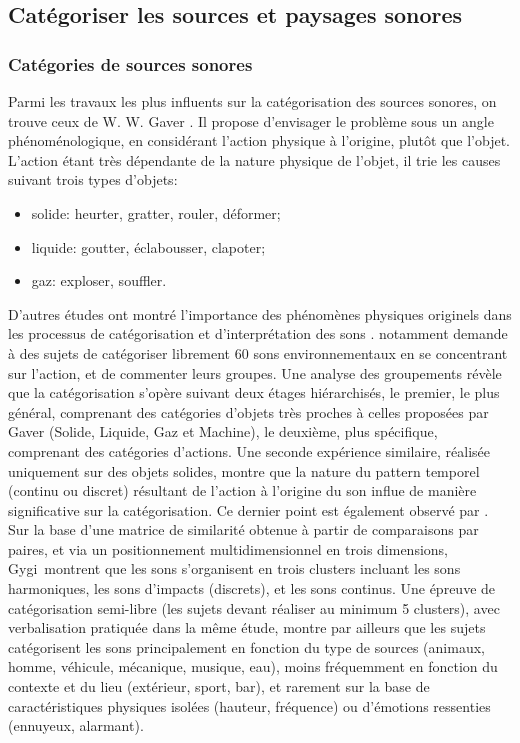 \subsection{Catégoriser les sources et paysages sonores}
\label{sec:ch3_catSourceSoundScape}

\subsubsection{Catégories de sources sonores}
\label{sec:ch3_catSource}

Parmi les travaux les plus influents sur la catégorisation des sources sonores, on trouve ceux de W. W. Gaver \citep{gaver1993world,gaver1993we}. Il propose d'envisager le problème sous un angle phénoménologique, en considérant l'action physique à l'origine, plutôt que l'objet. L'action étant très dépendante de la nature physique de l'objet, il trie les causes suivant trois types d'objets:

\begin{itemize}
\item solide: heurter, gratter, rouler, déformer;
\item liquide: goutter, éclabousser, clapoter;
\item gaz: exploser, souffler.
\end{itemize} 

D'autres études ont montré l'importance des phénomènes physiques originels dans les processus de catégorisation et d'interprétation des sons \citep{marcell2000confrontation,lemaitre2010listener}. \citep{houix_lexical_2012} notamment demande à des sujets de catégoriser librement 60 sons environnementaux en se concentrant sur l'action, et de commenter leurs groupes. Une analyse des groupements révèle que la catégorisation s'opère suivant deux étages hiérarchisés, le premier, le plus général, comprenant des catégories d'objets très proches à celles proposées par Gaver (Solide, Liquide, Gaz et Machine), le deuxième, plus spécifique, comprenant des catégories d'actions. Une seconde expérience similaire, réalisée uniquement sur des objets solides, montre que la nature du pattern temporel (continu ou discret) résultant de l'action à l'origine du son influe de manière significative sur la catégorisation. Ce dernier point est également observé par \citep{gygi2007similarity}. Sur la base d'une matrice de similarité obtenue à partir de comparaisons par paires, et via un positionnement multidimensionnel en trois dimensions, Gygi~\al montrent que les sons s'organisent en trois clusters incluant les sons harmoniques, les sons d'impacts (discrets), et les sons continus. Une épreuve de catégorisation semi-libre (les sujets devant réaliser au minimum 5 clusters), avec verbalisation pratiquée dans la même étude, montre par ailleurs que les sujets catégorisent les sons principalement en fonction du type de sources (animaux, homme, véhicule, mécanique, musique, eau), moins fréquemment en fonction du contexte et du lieu (extérieur, sport, bar), et rarement sur la base de caractéristiques physiques isolées (hauteur, fréquence) ou d'émotions ressenties (ennuyeux, alarmant).

